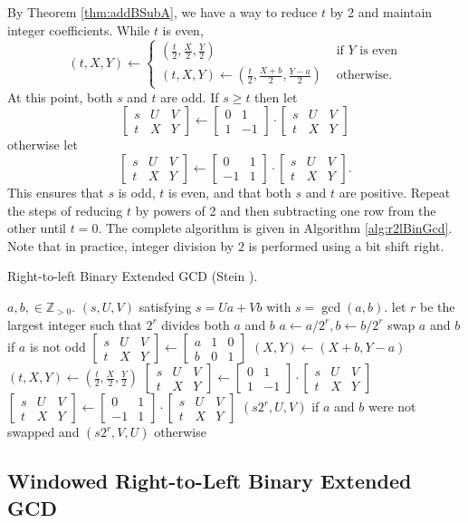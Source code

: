 \documentclass{ucalgthes1}
\theoremstyle{definition}
\newcommand{\ZZgtz}{\mathbb{Z}_{>0}}
\newcommand{\matrixtt}[4]{\left[ \begin{array}{rr} #1 & #2 \\ #3 & #4 \end{array} \right]}
\newcommand{\matrixThreeTwo}[6]{\left[ \begin{array}{rrr} #1 & #2 & #3 \\ #4 & #5 & #6 \end{array} \right]}
\begin{document}
By Theorem \ref{thm:addBSubA}, we have a way to reduce $t$ by 2 and maintain integer coefficients.  While $t$ is even, 
\[
	(t, X, Y) \gets \begin{cases}
		\left( \frac{t}{2}, \frac{X}{2}, \frac{Y}{2} \right) &
			\textrm{ if $Y$ is even} \\
		(t, X, Y) \gets \left( \frac{t}{2}, \frac{X+b}{2}, \frac{Y-a}{2} \right) & 
			\textrm{ otherwise.}
	\end{cases}
\]
At this point, both $s$ and $t$ are odd.  If $s \ge t$ then let
\[
	\matrixThreeTwo{s}{U}{V}{t}{X}{Y} \gets \matrixtt{0}{1}{1}{-1} \cdot \matrixThreeTwo{s}{U}{V}{t}{X}{Y}
\]
otherwise let
\[
	\matrixThreeTwo{s}{U}{V}{t}{X}{Y} \gets \matrixtt{0}{1}{-1}{1} \cdot \matrixThreeTwo{s}{U}{V}{t}{X}{Y}.
\]
This ensures that $s$ is odd, $t$ is even, and that both $s$ and $t$ are positive.  Repeat the steps of reducing $t$ by powers of 2 and then subtracting one row from the other until $t=0$.  The complete algorithm is given in Algorithm \ref{alg:r2lBinGcd}.  Note that in practice, integer division by 2 is performed using a bit shift right.

\begin{algorithm}[htb]
\caption{Right-to-left Binary Extended GCD (Stein \cite{Stein1967}).}
\label{alg:r2lBinGcd}
\begin{algorithmic}[1]
\Require $a,b, \in \ZZgtz$.
\Ensure $(s, U, V)$ satisfying $s = Ua + Vb$ with $s = \gcd(a, b)$.
\State let $r$ be the largest integer such that $2^r$ divides both $a$ and $b$
\State $a \gets a / 2^r, b \gets b / 2^r$
\State swap $a$ and $b$ if $a$ is not odd
\State $\matrixThreeTwo{s}{U}{V}{t}{X}{Y} \gets \matrixThreeTwo{a}{1}{0}{b}{0}{1}$
			\State $(X, Y) \gets (X+b, Y-a)$
		\EndIf
		\State $(t, X, Y) \gets \left( \frac{t}{2}, \frac{X}{2}, \frac{Y}{2} \right)$
	\EndWhile
		\State $\matrixThreeTwo{s}{U}{V}{t}{X}{Y} \gets \matrixtt{0}{1}{1}{-1} \cdot \matrixThreeTwo{s}{U}{V}{t}{X}{Y}$
	\Else
		\State $\matrixThreeTwo{s}{U}{V}{t}{X}{Y} \gets \matrixtt{0}{1}{-1}{1} \cdot \matrixThreeTwo{s}{U}{V}{t}{X}{Y}$
	\EndIf
\EndWhile
\State \Return $(s2^r, U, V)$ if $a$ and $b$ were not swapped and $(s2^r, V, U)$ otherwise
\end{algorithmic}
\end{algorithm}


\subsection{Windowed Right-to-Left Binary Extended GCD}
\label{subsec:gcdR2LWindowed}
\end{document}
